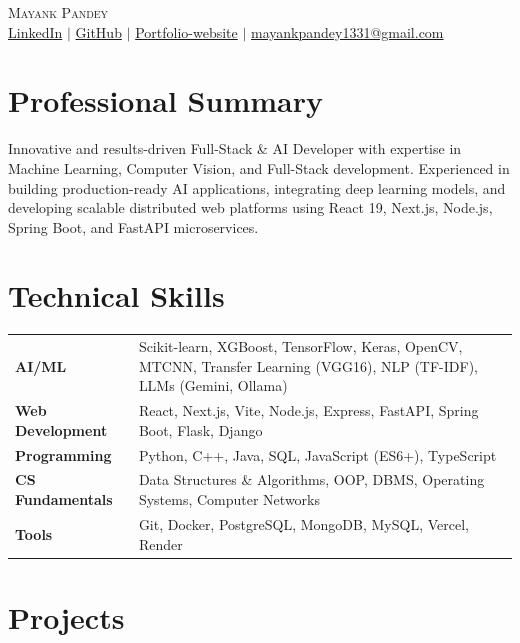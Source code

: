 \documentclass[letterpaper,10pt]{article}
\begin{document}
\begin{center}
    {\Huge \scshape Mayank Pandey} \\ \vspace{4pt}
    \small 
    \href{https://linkedin.com/in/mayank-pandey1331}{LinkedIn} 
    $|$ \href{https://github.com/MAYANK479}{GitHub} 
    $|$ \href{https://portfolio-mayank-projects1.vercel.app}{Portfolio-website} 
    $|$ \href{mailto:mayankpandey1331@gmail.com}{mayankpandey1331@gmail.com}
\end{center}

\section{Professional Summary}
\small{Innovative and results-driven Full-Stack \& AI Developer with expertise in Machine Learning, Computer Vision, and Full-Stack development. Experienced in building production-ready AI applications, integrating deep learning models, and developing scalable distributed web platforms using React 19, Next.js, Node.js, Spring Boot, and FastAPI microservices.}

\section{Technical Skills}
\begin{tabularx}{\textwidth}{@{}p{1.3in} X@{}}
\textbf{AI/ML} & Scikit-learn, XGBoost, TensorFlow, Keras, OpenCV, MTCNN, Transfer Learning (VGG16), NLP (TF-IDF), LLMs (Gemini, Ollama) \\
\textbf{Web Development} & React, Next.js, Vite, Node.js, Express, FastAPI, Spring Boot, Flask, Django \\
\textbf{Programming} & Python, C++, Java, SQL, JavaScript (ES6+), TypeScript \\
\textbf{CS Fundamentals} & Data Structures \& Algorithms, OOP, DBMS, Operating Systems, Computer Networks \\
\textbf{Tools} & Git, Docker, PostgreSQL, MongoDB, MySQL, Vercel, Render \\
\end{tabularx}

\section{Projects}
\end{document}
